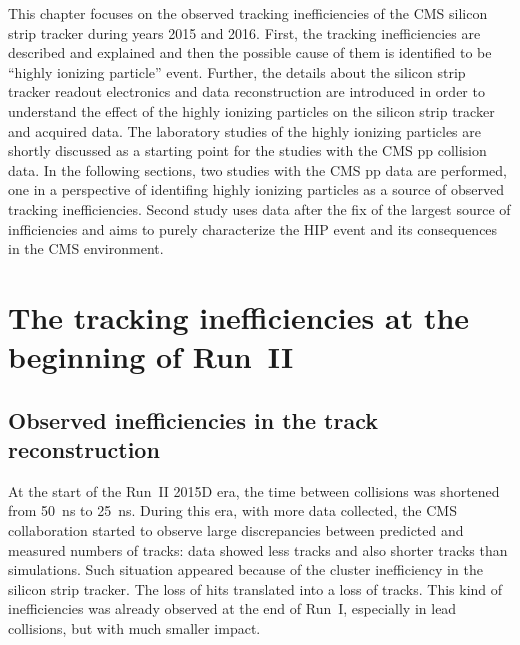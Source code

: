 
\clearpage

\setcounter{secnumdepth}{4}
\setcounter{secnumdepth}{4}


This chapter focuses on the observed tracking inefficiencies of the CMS silicon strip tracker during years 2015 and 2016. First, the tracking inefficiencies are described and explained and then the possible cause of them is identified to be ``highly ionizing particle'' event. Further, the details about the silicon strip tracker readout electronics and data reconstruction are introduced in order to understand the effect of the highly ionizing particles on the silicon strip tracker and acquired data. The laboratory studies of the highly ionizing particles are shortly discussed as a starting point for the studies with the CMS pp collision data. In the following sections, two studies with the CMS pp data are performed, one in a perspective of identifing highly ionizing particles as a source of observed tracking inefficiencies. Second study uses data after the fix of the largest source of infficiencies and aims to purely characterize the HIP event and its consequences in the CMS environment.

\section{The tracking inefficiencies at the beginning of Run~II~\label{sec:hitIneff}}

\subsection{Observed inefficiencies in the track reconstruction}

At the start of the Run~II 2015D era, the time between collisions was shortened from 50~ns to 25~ns. During this era, with more data collected, the CMS collaboration started to observe large discrepancies between predicted and measured numbers of tracks: data showed less tracks and also shorter tracks than simulations. Such situation appeared because of the cluster inefficiency in the silicon strip tracker. The loss of hits translated into a loss of tracks. This kind of inefficiencies was already observed at the end of Run~I, especially in lead collisions, but with much smaller impact. 

